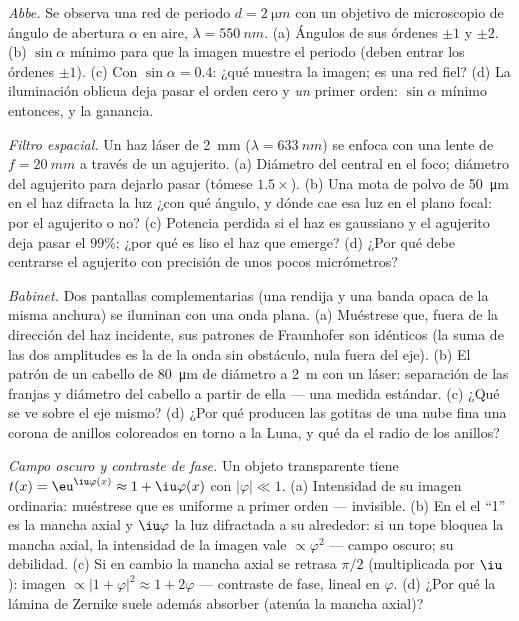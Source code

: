 \begin{exercise}[$\star\star$]\label{exo:b2:diffraction:8}
\emph{Abbe.} Se observa una red de periodo $d = \qty{2}{\micro m}$ con un
objetivo de microscopio de ángulo de abertura $\alpha$ en aire, $\lambda = \qty{550}{nm}$.
(a) Ángulos de sus órdenes $\pm1$ y $\pm2$. (b) $\sin\alpha$ mínimo para que la imagen
muestre el periodo (deben entrar los órdenes $\pm1$). (c) Con $\sin\alpha = 0.4$: ¿qué
muestra la imagen; es una red fiel? (d) La iluminación oblicua deja pasar
el orden cero y \emph{un} primer orden:
$\sin\alpha$ mínimo entonces, y la ganancia.
\end{exercise}

\begin{exercise}[$\star\star$]\label{exo:b2:diffraction:9}
\emph{Filtro espacial.} Un haz láser de \qty{2}{mm} ($\lambda = \qty{633}{nm}$) se
enfoca con una lente de $f = \qty{20}{mm}$ a través de un agujerito. (a) Diámetro del
 central en el foco; diámetro del agujerito para dejarlo pasar
(tómese $1.5\times$). (b) Una mota de polvo de \qty{50}{\micro m} en el haz
difracta la luz ¿con qué ángulo, y dónde cae esa luz en el
plano focal: por el agujerito o no? (c) Potencia perdida si el haz
es gaussiano y el agujerito deja pasar el $99\%$; ¿por qué es liso el haz
que emerge? (d) ¿Por qué debe centrarse el agujerito con precisión de unos pocos
micrómetros?
\end{exercise}

\begin{exercise}[$\star\star\star$]\label{exo:b2:diffraction:10}
\emph{Babinet.} Dos pantallas complementarias (una rendija y una banda
opaca de la misma anchura) se iluminan con una onda plana. (a) Muéstrese que, fuera
de la dirección del haz incidente, sus patrones de Fraunhofer
son idénticos (la suma de las dos amplitudes es la de la
onda sin obstáculo, nula fuera del eje). (b) El patrón de un cabello de
\qty{80}{\micro m} de diámetro a \qty{2}{m} con un láser: separación de las franjas y
diámetro del cabello a partir de ella --- una medida estándar. (c) ¿Qué se ve
sobre el eje mismo? (d) ¿Por qué producen las gotitas de una nube fina una
corona de anillos coloreados en torno a la Luna, y qué da el radio de los
anillos?
\end{exercise}

\begin{exercise}[$\star\star\star$]\label{exo:b2:diffraction:11}
\emph{Campo oscuro y contraste de fase.} Un objeto transparente tiene
$t(x) = \eu^{\iu\varphi(x)} \approx 1 + \iu\varphi(x)$ con $|\varphi| \ll 1$. (a) Intensidad de
su imagen ordinaria: muéstrese que es uniforme a primer orden --- invisible. (b)
En el  el ``1'' es la mancha axial y $\iu\varphi$ la
luz difractada a su alrededor: si un tope bloquea la mancha axial, la intensidad de la
imagen vale $\propto\varphi^2$ --- campo oscuro; su debilidad. (c) Si en cambio la
mancha axial se retrasa $\pi/2$ (multiplicada por $\iu$): imagen $\propto|1 +
\varphi|^2 \approx 1 + 2\varphi$ --- contraste de fase, lineal en $\varphi$. (d) ¿Por qué la
lámina de Zernike suele además absorber (atenúa la mancha axial)?
\end{exercise}

